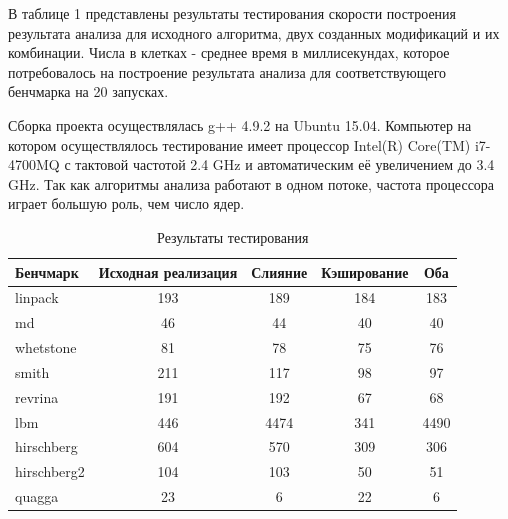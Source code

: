 \Conc

В таблице 1 представлены результаты тестирования скорости построения результата анализа для исходного алгоритма, двух созданных модификаций и их комбинации. Числа в клетках - среднее время в миллисекундах, которое потребовалось на построение результата анализа для соответствующего бенчмарка на 20 запусках.

Сборка проекта осуществлялась g++ 4.9.2 на Ubuntu 15.04. Компьютер на котором осуществлялось тестирование имеет процессор Intel(R) Core(TM) i7-4700MQ с тактовой частотой 2.4 GHz и автоматическим её увеличением до 3.4 GHz. Так как алгоритмы анализа работают в одном потоке, частота процессора играет большую роль, чем число ядер.

\begin{table}[h!]
\label{tabl:Profiling}
\begin{tabular}{l | c | c | c | c }
Бенчмарк & Исходная реализация & Слияние & Кэширование & Оба \\
\hline \hline
linpack & 193 & 189 & 184 & 183 \\
md & 46 & 44 & 40 & 40\\ 
whetstone & 81 & 78 & 75 & 76\\
smith & 211 & 117 & 98 & 97\\
revrina & 191 & 192 & 67 & 68\\
lbm & 446 & 4474 & 341 & 4490\\
hirschberg & 604 & 570 & 309 & 306\\
hirschberg2 & 104 & 103 & 50 & 51\\
quagga & 23 & 6 & 22 & 6
\end{tabular}
\caption{Результаты тестирования}
\end{table}

\newpage %

\printbibliography[
    heading=bibintoc%
    ,title=Библиография %
]

